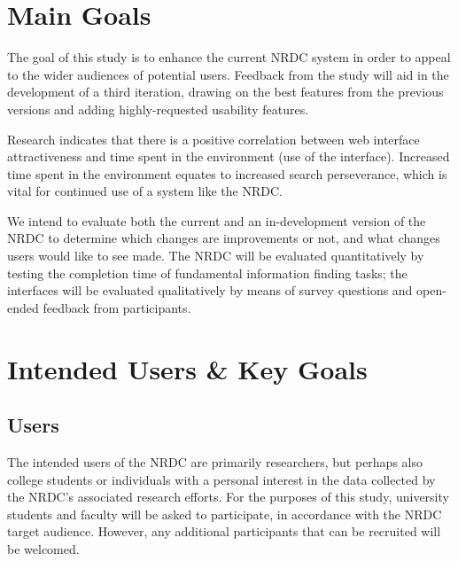 \documentclass{article}
\begin{document}
%
%
\newpage
\section{Main Goals}
The goal of this study is to enhance the current NRDC system in order to appeal to the wider audiences of potential users. Feedback from the study will aid in the development of a third iteration, drawing on the best features from the previous versions and adding highly-requested usability features.

Research indicates that there is a positive correlation between web interface attractiveness and time spent in the environment (use of the interface). Increased time spent in the environment equates to increased search perseverance\cite{PerceivedAttractiveness}, which is vital for continued use of a system like the NRDC.

We intend to evaluate both the current and an in-development version of the NRDC to determine which changes are improvements or not, and what changes users would like to see made. The NRDC  will be evaluated quantitatively by testing the completion time of fundamental information finding tasks; the interfaces will be evaluated qualitatively by means of survey questions and open-ended feedback from participants\cite{information-and-web-services}.

%
%
\section{Intended Users \& Key Goals}
%
\subsection{Users}
The intended users of the NRDC are primarily researchers, but perhaps also college students or individuals with a personal interest in the data collected by the NRDC's associated research efforts. For the purposes of this study, university students and faculty will be asked to participate, in accordance with the NRDC target audience. However, any additional participants that can be recruited will be welcomed\cite{dontmakemethink}.
\end{document}
